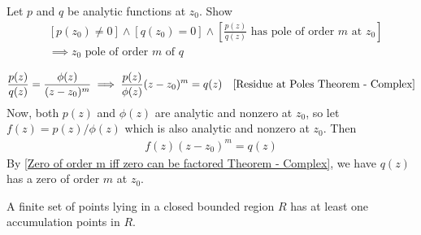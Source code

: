 \documentclass[12pt, english]{book}
\makeatletter
\renewenvironment{proof}[1][\proofname]{\par
	\pushQED{\qed}%
	\normalfont \topsep6\p@\@plus6\p@\relax
	\list{}{%
		\settowidth{\leftmargin}{\itshape\proofname:\hskip\labelsep}%
		\setlength{\labelwidth}{0pt}%
		\setlength{\itemindent}{-\leftmargin}%
		}%
	\item[\hskip\labelsep\itshape#1\@addpunct{:}]\ignorespaces
	}{\popQED\endlist\@endpefalse}
\makeatother
\begin{document}
	\begin{example}
		\label{Function pole order takes on zero order of quotient converse example - Complex}
		Let \(p\) and \(q\) be analytic functions at \(z_0\). Show
		\begin{align*}
			&[p(z_0) \neq 0] \land [q(z_0) = 0] \land \left[ \frac{p(z)}{q(z)} \text{ has pole of order } m \text{ at } z_0\right]\\
			&\implies z_0 \text{ pole of order } m \text{ of } q
		\end{align*}
	\end{example}
	\begin{proof}
		{\color{Grey}
		\begin{align*}
			\frac{p(z)}{q(z)} = \frac{\phi(z)}{(z-z_0)^m}
			&\implies \frac{p(z)}{\phi(z)} (z-z_0)^m = q(z) &\text{\Cref{Residue at Poles Theorem - Complex}}
		\end{align*}
		Now, both \(p(z)\) and \(\phi(z)\) are analytic and nonzero at \(z_0\), so let \(f(z) = p(z)/\phi(z)\) which is also analytic and nonzero at \(z_0\). Then 
		\begin{align*}
			f(z)(z-z_0)^m = q(z)
		\end{align*}
		By \cref{Zero of order m iff zero can be factored Theorem - Complex}, we have \(q(z)\) has a zero of order \(m\) at \(z_0\).
		}
	\end{proof}

	\begin{theorem}
		\label{Bolzano-Weierstrass Theorem - Complex}
		A finite set of points lying in a closed bounded region \(R\) has at least one accumulation points in \(R\).
	\end{theorem}
\end{document}
